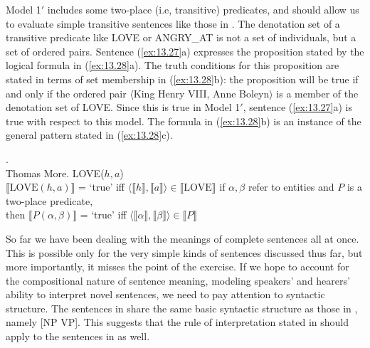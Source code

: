 Model 1$'$ includes some two-place (i.e, transitive) predicates, and should allow us to evaluate simple transitive sentences like those in . The denotation set of a transitive predicate like LOVE or ANGRY\_AT is not a set of individuals, but a set of ordered pairs. Sentence (\ref{ex:13.27}a) expresses the proposition stated by the logical formula in (\ref{ex:13.28}a). The truth conditions for this proposition are stated in terms of set membership in (\ref{ex:13.28}b): the proposition will be true if and only if the ordered pair $\langle$King Henry VIII, Anne Boleyn$\rangle$ is a member of the denotation set of LOVE. Since this is true in Model 1$'$, sentence (\ref{ex:13.27}a) is true with respect to this model. The formula in (\ref{ex:13.28}b) is an instance of the general pattern stated in (\ref{ex:13.28}c).


\ea \label{ex:13.27}
.\\
  {Thomas More}.
                       \z
\ex \label{ex:13.28}
\ea  LOVE($h,a$)\\
\ex  $\llbracket\text{LOVE}(h,a)\rrbracket$  = ‘true’  
    iff  
    $\langle\llbracket h\rrbracket,\llbracket a\rrbracket \rangle \in \llbracket\text{LOVE}\rrbracket$ 
\ex  if $\alpha, \beta$ refer to entities and $P$ is a two-place predicate,\\
  then  $\llbracket P(\alpha,\beta)\rrbracket$  = ‘true’  
  iff  
  $\langle\llbracket \alpha\rrbracket,\llbracket \beta\rrbracket \rangle \in \llbracket P\rrbracket$ 
\z \z


So far we have been dealing with the meanings of complete sentences all at once. This is possible only for the very simple kinds of sentences discussed thus far, but more importantly, it misses the point of the exercise. If we hope to account for the compositional nature of sentence meaning, modeling speakers’ and hearers’ ability to interpret novel sentences, we need to pay attention to syntactic structure. The sentences in  share the same basic syntactic structure as those in , namely [NP VP]. This suggests that the rule of interpretation stated in  should apply to the sentences in  as well.



